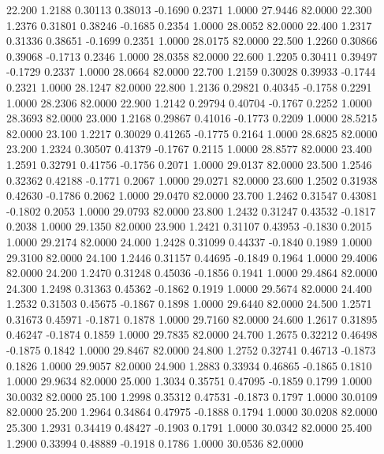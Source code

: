   22.200   1.2188   0.30113   0.38013  -0.1690   0.2371   1.0000  27.9446  82.0000
  22.300   1.2376   0.31801   0.38246  -0.1685   0.2354   1.0000  28.0052  82.0000
  22.400   1.2317   0.31336   0.38651  -0.1699   0.2351   1.0000  28.0175  82.0000
  22.500   1.2260   0.30866   0.39068  -0.1713   0.2346   1.0000  28.0358  82.0000
  22.600   1.2205   0.30411   0.39497  -0.1729   0.2337   1.0000  28.0664  82.0000
  22.700   1.2159   0.30028   0.39933  -0.1744   0.2321   1.0000  28.1247  82.0000
  22.800   1.2136   0.29821   0.40345  -0.1758   0.2291   1.0000  28.2306  82.0000
  22.900   1.2142   0.29794   0.40704  -0.1767   0.2252   1.0000  28.3693  82.0000
  23.000   1.2168   0.29867   0.41016  -0.1773   0.2209   1.0000  28.5215  82.0000
  23.100   1.2217   0.30029   0.41265  -0.1775   0.2164   1.0000  28.6825  82.0000
  23.200   1.2324   0.30507   0.41379  -0.1767   0.2115   1.0000  28.8577  82.0000
  23.400   1.2591   0.32791   0.41756  -0.1756   0.2071   1.0000  29.0137  82.0000
  23.500   1.2546   0.32362   0.42188  -0.1771   0.2067   1.0000  29.0271  82.0000
  23.600   1.2502   0.31938   0.42630  -0.1786   0.2062   1.0000  29.0470  82.0000
  23.700   1.2462   0.31547   0.43081  -0.1802   0.2053   1.0000  29.0793  82.0000
  23.800   1.2432   0.31247   0.43532  -0.1817   0.2038   1.0000  29.1350  82.0000
  23.900   1.2421   0.31107   0.43953  -0.1830   0.2015   1.0000  29.2174  82.0000
  24.000   1.2428   0.31099   0.44337  -0.1840   0.1989   1.0000  29.3100  82.0000
  24.100   1.2446   0.31157   0.44695  -0.1849   0.1964   1.0000  29.4006  82.0000
  24.200   1.2470   0.31248   0.45036  -0.1856   0.1941   1.0000  29.4864  82.0000
  24.300   1.2498   0.31363   0.45362  -0.1862   0.1919   1.0000  29.5674  82.0000
  24.400   1.2532   0.31503   0.45675  -0.1867   0.1898   1.0000  29.6440  82.0000
  24.500   1.2571   0.31673   0.45971  -0.1871   0.1878   1.0000  29.7160  82.0000
  24.600   1.2617   0.31895   0.46247  -0.1874   0.1859   1.0000  29.7835  82.0000
  24.700   1.2675   0.32212   0.46498  -0.1875   0.1842   1.0000  29.8467  82.0000
  24.800   1.2752   0.32741   0.46713  -0.1873   0.1826   1.0000  29.9057  82.0000
  24.900   1.2883   0.33934   0.46865  -0.1865   0.1810   1.0000  29.9634  82.0000
  25.000   1.3034   0.35751   0.47095  -0.1859   0.1799   1.0000  30.0032  82.0000
  25.100   1.2998   0.35312   0.47531  -0.1873   0.1797   1.0000  30.0109  82.0000
  25.200   1.2964   0.34864   0.47975  -0.1888   0.1794   1.0000  30.0208  82.0000
  25.300   1.2931   0.34419   0.48427  -0.1903   0.1791   1.0000  30.0342  82.0000
  25.400   1.2900   0.33994   0.48889  -0.1918   0.1786   1.0000  30.0536  82.0000
